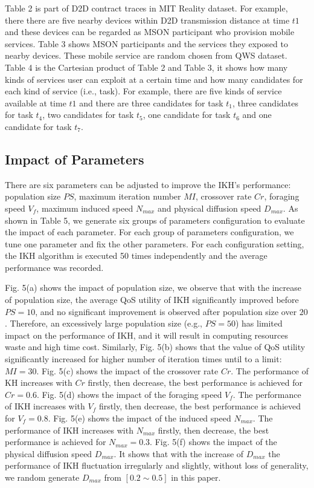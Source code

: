 \documentclass[10pt,journal,compsoc]{IEEEtran}
\begin{document}
Table 2 is part of D2D contract traces in MIT Reality dataset. For example, there there are five nearby devices within D2D transmission distance at time $t1$ and these devices can be regarded as MSON participant who provision mobile services. Table 3 shows MSON participants and the services they exposed to nearby devices. These mobile service are random chosen from QWS dataset. Table 4 is the Cartesian product of Table 2 and Table 3, it shows how many kinds of services user can exploit at a certain time and how many candidates for each kind of service (i.e., task). For example, there are five kinds of service available at time $t1$ and there are three candidates for task $t_1$, three candidates for task $t_4$, two candidates for task $t_5$, one candidate for task $t_6$ and one candidate for task $t_7$.


\subsection{Impact of Parameters}
There are six parameters can be adjusted to improve the IKH's performance: population size $PS$, maximum iteration number $MI$, crossover rate $Cr$, foraging speed $V_f$, maximum induced speed $N_{max}$ and physical diffusion speed $D_{max}$. As shown in Table 5, we generate six groups of parameters configuration to evaluate the impact of each parameter. For each group of parameters configuration, we tune one parameter and fix the other parameters. For each configuration setting, the IKH algorithm is executed 50 times independently and the average performance was recorded.

Fig. 5(a) shows the impact of population size, we observe that with the increase of population size, the average QoS utility of IKH significantly improved before $PS=10$, and no significant improvement is observed after population size over $20$. Therefore, an excessively large population size (e.g., $PS=50$) has limited impact on the performance of IKH, and it will result in computing resources waste and high time cost.
Similarly, Fig. 5(b) shows that the value of QoS utility significantly increased for higher number of iteration times until to a limit: $MI = 30$. 
Fig. 5(c) shows the impact of the crossover rate $Cr$. The performance of KH increases with $Cr$ firstly, then decrease, the best performance is achieved for $Cr = 0.6$.
Fig. 5(d) shows the impact of the foraging speed $V_f$. The performance of IKH increases with $V_f$ firstly, then decrease, the best performance is achieved for $V_f = 0.8$.
Fig. 5(e) shows the impact of the induced speed $N_{max}$. The performance of IKH increases with $N_{max}$ firstly, then decrease, the best performance is achieved for $N_{max} = 0.3$.
Fig. 5(f) shows the impact of the physical diffusion speed $D_{max}$. It shows that with the increase of $D_{max}$ the performance of IKH fluctuation irregularly and slightly, without loss of generality, we random generate $D_{max}$ from $[0.2 \sim 0.5]$ in this paper.
\end{document}
